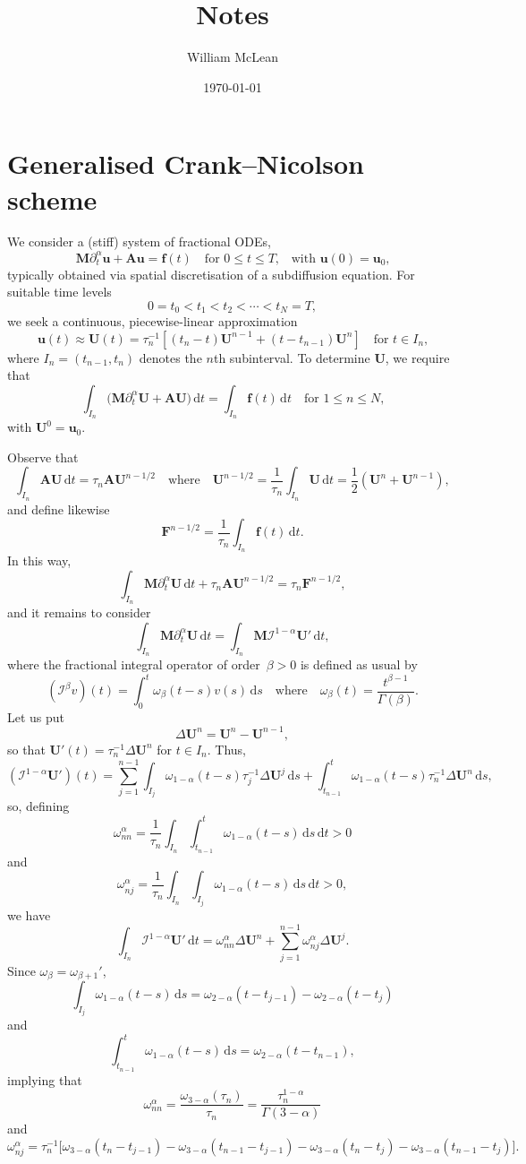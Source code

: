 \documentclass[a4paper,12pt]{article}
\title{Notes}
\date{\today}
\author{William McLean}
\newcommand{\bs}[1]{\boldsymbol{#1}}
\newcommand{\ud}{\mathrm{d}}
\begin{document}
\maketitle
\section{Generalised Crank--Nicolson scheme}
We consider a (stiff) system of fractional ODEs,
\[
\bs{M}\partial_t^\alpha\bs{u}+\bs{A}\bs{u}=\bs{f}(t)
    \quad\text{for $0\le t\le T$,}\quad\text{with $\bs{u}(0)=\bs{u}_0$,}
\]
typically obtained via spatial discretisation of a subdiffusion equation.
For suitable time levels
\[
0=t_0<t_1<t_2<\cdots<t_N=T,
\]
we seek a continuous, piecewise-linear approximation
\[
\bs{u}(t)\approx\bs{U}(t)=\tau_n^{-1}[(t_n-t)\bs{U}^{n-1}+(t-t_{n-1})\bs{U}^n]
\quad\text{for $t\in I_n$,}
\]
where $I_n=(t_{n-1},t_n)$ denotes the $n$th subinterval.  To determine $\bs{U}$,
we require that
\[
\int_{I_n}\bigl(\bs{M}\partial_t^\alpha\bs{U}+\bs{A}\bs{U}\bigr)\,\ud t
    =\int_{I_n}\bs{f}(t)\,\ud t\quad\text{for $1\le n\le N$,}
\]
with $\bs{U}^0=\bs{u}_0$.

Observe that
\[
\int_{I_n}\bs{A}\bs{U}\,\ud t=\tau_n\bs{A}\bs{U}^{n-1/2}\quad\text{where}\quad
\bs{U}^{n-1/2}=\frac{1}{\tau_n}\int_{I_n}\bs{U}\,\ud t
    =\frac{1}{2}(\bs{U}^n+\bs{U}^{n-1}),
\]
and define likewise
\[
\bs{F}^{n-1/2}=\frac{1}{\tau_n}\int_{I_n}\bs{f}(t)\,\ud t.
\]
In this way,
\[
\int_{I_n}\bs{M}\partial_t^\alpha\bs{U}\,\ud t+\tau_n\bs{A}\bs{U}^{n-1/2}
    =\tau_n\bs{F}^{n-1/2},
\]
and it remains to consider
\[
\int_{I_n}\bs{M}\partial_t^\alpha\bs{U}\,\ud t
    =\int_{I_n}\bs{M}\mathcal{I}^{1-\alpha}\bs{U}'\,\ud t,
\]
where the fractional integral operator of order~$\beta>0$ is defined as usual by
\[
(\mathcal{I}^\beta v)(t)=\int_0^t\omega_\beta(t-s)v(s)\,\ud s
\quad\text{where}\quad\omega_\beta(t)=\frac{t^{\beta-1}}{\Gamma(\beta)}.
\]
Let us put
\[
\Delta\bs{U}^n=\bs{U}^n-\bs{U}^{n-1},
\]
so that $\bs{U}'(t)=\tau_n^{-1}\Delta\bs{U}^n$ for $t\in I_n$. Thus,
\[
(\mathcal{I}^{1-\alpha}\bs{U}')(t)=\sum_{j=1}^{n-1}\int_{I_j}
    \omega_{1-\alpha}(t-s)\tau_j^{-1}\Delta\bs{U}^j\,\ud s
    +\int_{t_{n-1}}^t\omega_{1-\alpha}(t-s)\tau_n^{-1}\Delta\bs{U}^n\,\ud s,
\]
so, defining
\[
\omega^\alpha_{nn}=\frac{1}{\tau_n}\int_{I_n}\int_{t_{n-1}}^t
    \omega_{1-\alpha}(t-s)\,\ud s\,\ud t>0
\]
and
\[
\omega^\alpha_{nj}=\frac{1}{\tau_n}\int_{I_n}\int_{I_j}
    \omega_{1-\alpha}(t-s)\,\ud s\,\ud t>0,
\]
we have
\[
\int_{I_n}\mathcal{I}^{1-\alpha}\bs{U}'\,\ud t
    =\omega^\alpha_{nn}\Delta\bs{U}^n
    +\sum_{j=1}^{n-1}\omega^\alpha_{nj}\Delta\bs{U}^j.
\]
Since $\omega_\beta=\omega_{\beta+1}'$,
\[
\int_{I_j}\omega_{1-\alpha}(t-s)\,\ud s
    =\omega_{2-\alpha}(t-t_{j-1})-\omega_{2-\alpha}(t-t_j)
\]
and
\[
\int_{t_{n-1}}^t\omega_{1-\alpha}(t-s)\,\ud s=\omega_{2-\alpha}(t-t_{n-1}),
\]
implying that
\[
\omega^\alpha_{nn}=\frac{\omega_{3-\alpha}(\tau_n)}{\tau_n}
    =\frac{\tau_n^{1-\alpha}}{\Gamma(3-\alpha)}
\]
and
\[
\omega^\alpha_{nj}=\tau_n^{-1}\bigl[
\omega_{3-\alpha}(t_n-t_{j-1})-\omega_{3-\alpha}(t_{n-1}-t_{j-1})
-\omega_{3-\alpha}(t_n-t_j)-\omega_{3-\alpha}(t_{n-1}-t_j)\bigr].
\]
\end{document}
